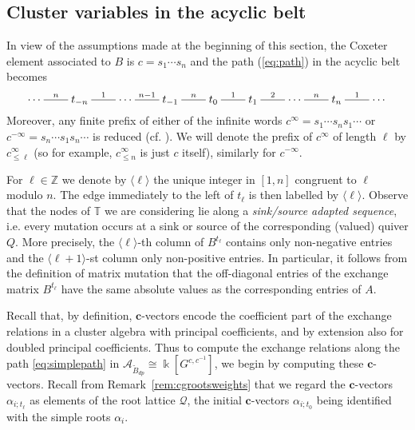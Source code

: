 \documentclass[12pt]{amsart}
\newcommand{\cA}{\mathcal{A}}
\newcommand{\TT}{\mathbb{T}}
\newcommand{\ZZ}{\mathbb{Z}}
\newcommand{\kk}{\Bbbk}
\newcommand{\bfc}{\mathbf{c}}
\newcommand{\cv}{\alpha}
\newcommand{\cQ}{\mathcal{Q}}
\newcommand{\dashname}[1]{\stackrel{#1}{\begin{picture}(22,3)\put(0,2.5){\line(1,0){22}}\end{picture}}}
\renewcommand{\mod}[1]{\langle {#1} \rangle}
\newcommand{\Bdp}{\widetilde{B}_{dp}}
\newcommand{\Zidx}{\ell}
\theoremstyle{remark}
\numberwithin{equation}{section}
\numberwithin{figure}{section}
\begin{document}
\subsection{Cluster variables in the acyclic belt}
\label{sec:acyclic_belt}

In view of the assumptions made at the beginning of this section, the Coxeter element associated to $B$ is $c=s_1\cdots s_n$ and the path (\ref{eq:path}) in the acyclic belt becomes
\begin{equation}
\label{eq:simplepath}
  \cdots
  \dashname{n}
  t_{-n}
  \dashname{1}
  \cdots
  \dashname{n-1}
  t_{-1}
  \dashname{n}
  t_0
  \dashname{1}
  t_1
  \dashname{2}
  \cdots
  \dashname{n}
  t_n
  \dashname{1}
  \cdots
\end{equation}
Moreover, any finite prefix of either of the infinite words $c^\infty =  s_1 \cdots s_n s_1 \cdots$ or $c^{-\infty} = s_n \cdots s_1 s_n \cdots$ is reduced (cf. \cite{Spe09}).
We will denote the prefix of $c^\infty$ of length $\Zidx$ by $c^\infty_{\le\Zidx}$ (so for example, $c^\infty_{\leq n}$ is just $c$ itself), similarly for $c^{-\infty}$.

For $\Zidx\in\ZZ$ we denote by $\mod{\Zidx}$ the unique integer in $[1,n]$ congruent to $\Zidx$ modulo $n$.
The edge immediately to the left of $t_\Zidx$ is then labelled by $\mod{\Zidx}$.
Observe that the nodes of $\TT$ we are considering lie along a \emph{sink/source adapted sequence}, i.e. every mutation occurs at a sink or source of the corresponding (valued) quiver $Q$.
More precisely, the $\mod{\Zidx}$-th column of $B^{t_\Zidx}$ contains only non-negative entries and the $\mod{\Zidx+1}$-st column only non-positive entries.
In particular, it follows from the definition of matrix mutation that the off-diagonal entries of the exchange matrix $B^{t_\Zidx}$ have the same absolute values as the corresponding entries of $A$.

Recall that, by definition, $\bfc$-vectors encode the coefficient part of the exchange relations in a cluster algebra with principal coefficients, and by extension also for doubled principal coefficients. Thus to compute the exchange relations along the path \eqref{eq:simplepath} in $\cA_{\Bdp} \cong \kk[G^{c,c^{-1}}]$, we begin by computing these $\bfc$-vectors. 
Recall from Remark~\ref{rem:cgrootsweights} that we regard the $\bfc$-vectors $\cv_{i;t_\Zidx}$ as elements of the root lattice $\cQ$, the initial $\bfc$-vectors $\cv_{i;t_0}$ being identified with the simple roots $\alpha_i$.
\end{document}

